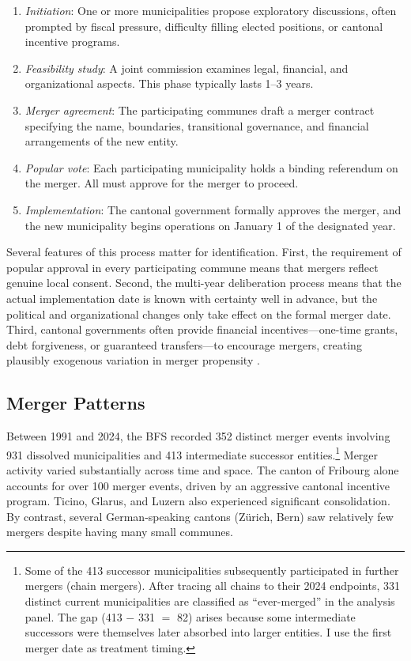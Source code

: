 \documentclass[12pt]{article}
\begin{document}
\begin{enumerate}
    \item \textit{Initiation}: One or more municipalities propose exploratory discussions, often prompted by fiscal pressure, difficulty filling elected positions, or cantonal incentive programs.
    \item \textit{Feasibility study}: A joint commission examines legal, financial, and organizational aspects. This phase typically lasts 1--3 years.
    \item \textit{Merger agreement}: The participating communes draft a merger contract specifying the name, boundaries, transitional governance, and financial arrangements of the new entity.
    \item \textit{Popular vote}: Each participating municipality holds a binding referendum on the merger. All must approve for the merger to proceed.
    \item \textit{Implementation}: The cantonal government formally approves the merger, and the new municipality begins operations on January 1 of the designated year.
\end{enumerate}

Several features of this process matter for identification. First, the requirement of popular approval in every participating commune means that mergers reflect genuine local consent. Second, the multi-year deliberation process means that the actual implementation date is known with certainty well in advance, but the political and organizational changes only take effect on the formal merger date. Third, cantonal governments often provide financial incentives---one-time grants, debt forgiveness, or guaranteed transfers---to encourage mergers, creating plausibly exogenous variation in merger propensity \citep{ladner2016handbuch}.

\subsection{Merger Patterns}

Between 1991 and 2024, the BFS recorded 352 distinct merger events involving 931 dissolved municipalities and 413 intermediate successor entities.\footnote{Some of the 413 successor municipalities subsequently participated in further mergers (chain mergers). After tracing all chains to their 2024 endpoints, 331 distinct current municipalities are classified as ``ever-merged'' in the analysis panel. The gap (413 $-$ 331 $=$ 82) arises because some intermediate successors were themselves later absorbed into larger entities. I use the first merger date as treatment timing.} Merger activity varied substantially across time and space. The canton of Fribourg alone accounts for over 100 merger events, driven by an aggressive cantonal incentive program. Ticino, Glarus, and Luzern also experienced significant consolidation. By contrast, several German-speaking cantons (Z\"urich, Bern) saw relatively few mergers despite having many small communes.
\end{document}

